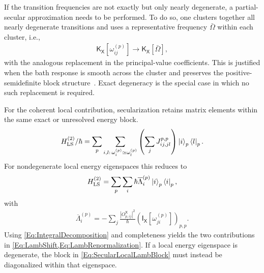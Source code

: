 \documentclass[prx,aps,twocolumn,article]{revtex4-2}
\newcommand{\msf}[1]{\mathsf{#1}}
\newcommand{\msIX}{\msf{I}_\msf{X}}
\newcommand{\msKX}{\msf{K}_\msf{X}}
\newcommand{\msX}{\msf{X}}
\begin{document}
If the transition frequencies are not exactly but only nearly degenerate, a partial-secular approximation needs to be performed. To do so, one clusters together all nearly degenerate transitions and uses a representative frequency $\bar\Omega$ within each cluster, i.e.,
\begin{align}
    \msKX[
        \omega_{ij}^{(p)}
    ]
    \longrightarrow
    \msKX[\bar\Omega],
\end{align}
with the analogous replacement in the principal-value coefficients.
This is justified when the bath response is smooth across the cluster and
preserves the positive-semidefinite block
structure~\cite{Schaller:2008,Cattaneo:2019,Trushechkin:2021}. Exact degeneracy is the special case in which no such replacement is
required.

For the coherent local contribution, secularization retains matrix elements
within the same exact or unresolved energy block. 
\begin{align}
    H_{\rm LS}^{(2)}/\hbar
    =
    \sum_p
    \sum_{i,l:\,\omega_i^{(p)}\simeq\omega_l^{(p)}}
    \left(
        \sum_j
        J_{ij,jl}^{p,p}
    \right)
    \ket{i}_p\bra{l}_p.
\label{Eq:SecularLocalLambBlock}
\end{align}
For nondegenerate local energy eigenspaces this reduces to
\begin{align}
    H_{\rm LS}^{(2)}
    =
    \sum_p\sum_i
    \hbar\overline\Lambda_i^{(p)}
    \ket{i}_p\bra{i}_p,
\end{align}
with
\begin{align}
    \overline\Lambda_i^{(p)}
    =
    -
    \sum_j
    \frac{
        |O_{p,ij}^{\msX}|^2
    }{\hbar}
    \left(
        \msIX[
            \omega_{ji}^{(p)}
        ]
    \right)_{p,p}.
\end{align}
Using \cref{Eq:IntegralDecomposition} and completeness yields the two
contributions in \cref{Eq:LambShift,Eq:LambRenormalization}.
If a local energy eigenspace is degenerate, the block in
\cref{Eq:SecularLocalLambBlock} must instead be diagonalized within that
eigenspace.
\end{document}
